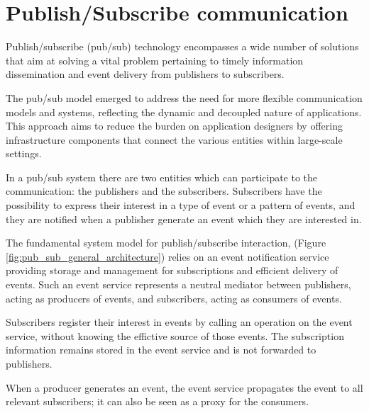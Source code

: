 

\chapter{Publish/Subscribe communication}

Publish/subscribe (pub/sub) technology encompasses a wide number of solutions
that aim at solving a vital problem pertaining to timely information
dissemination and event delivery from publishers to subscribers.
\cite{Pub/Sub_pattern}

The pub/sub model emerged to address the need for more flexible communication
models and systems, reflecting the dynamic and decoupled nature of
applications.
This approach aims to reduce the burden on application designers by offering
infrastructure components that connect the various entities within large-scale
settings. \cite{Many_faces_of_pub/sub}

In a pub/sub system there are two entities which can participate to the
communication: the publishers and the subscribers.
Subscribers have the possibility to express their interest in a type of event
or a pattern of events, and they are notified when a publisher generate an event
which they are interested in.

The fundamental system model for publish/subscribe interaction, (Figure 
\ref{fig:pub_sub_general_architecture}) relies on an event notification service
providing storage and management for subscriptions and efficient delivery of
events. Such an event service represents a neutral mediator between publishers,
acting as producers of events, and subscribers, acting as consumers of events.

Subscribers register their interest in events by calling an operation on the
event service, without knowing the effictive source of those events.
The subscription information remains stored in the event service and is not
forwarded to publishers.

When a producer generates an event, the event service propagates the event to
all relevant subscribers; it can also be seen as a proxy for the consumers.

